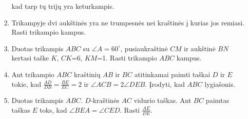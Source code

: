 \begin{enumerate}
  kad tarp tų trijų yra keturkampis.
\item Trikampyje dvi aukštinės yra ne trumpesnės nei kraštinės į kurias jos
  remiasi. Rasti trikampio kampus. 
\item Duotas trikampis $ABC$ su $\angle A = 60^\circ$, pusiaukraštinė $CM$
  ir aukštinė $BN$ kertasi taške $K$, $CK$=6, $KM$=1. Rasti trikampio $ABC$
  kampus.
\item Ant trikampio $ABC$ kraštinių $AB$ ir $BC$ atitinkamai paimti taškai
  $D$ ir $E$ tokie, kad $\frac{AD}{DB} =\frac{BE}{EC}=2$ ir $\angle ACB
  =2\angle DEB$. Įrodyti, kad $ABC$ lygiašonis.
\item Duotas trikampis $ABC$. $D$-kraštinės $AC$ vidurio taškas. Ant $BC$
  paimtas taškas $E$ toks, kad $\angle BEA =\angle CED$. Rasti
  $\frac{AE}{DE}$.
\end{enumerate}

